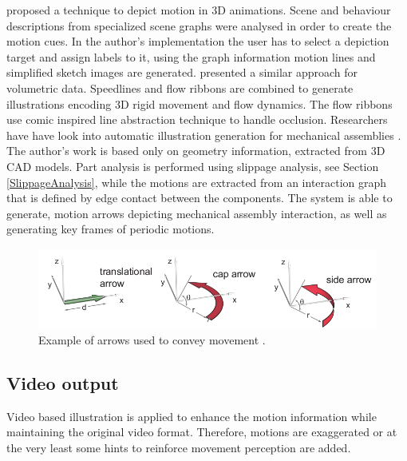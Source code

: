 \cite{Nienhaus2005} proposed a technique to depict motion in 3D animations.
Scene and behaviour descriptions from specialized scene graphs were analysed in order to create the motion cues.
In the author's implementation the user has to select a depiction target and assign labels to it, using the graph information motion lines and simplified sketch images are generated.
\cite{Joshi2005} presented a similar approach for volumetric data.
Speedlines and flow ribbons are combined to generate illustrations encoding 3D rigid movement and flow dynamics.
The flow ribbons use comic inspired line abstraction technique to handle occlusion.
Researchers have have look into automatic illustration generation for mechanical assemblies \cite{Mitra2010}.
The author's work is based only on geometry information, extracted from 3D CAD models.
Part analysis is performed using slippage analysis, see Section \ref{SlippageAnalysis}, while the motions are extracted from an interaction graph that is defined by edge contact between the components.
The system is able to generate, motion arrows depicting mechanical assembly interaction, as well as generating key frames of periodic motions.

\begin{figure}[!htbp]
	\centering
	\includegraphics[scale=.5]{images/arrow_types2}
	\caption{Example of arrows used to convey movement \cite{Mitra2010}.}
	\label{fig:arrowTypes}
\end{figure}

\subsection{Video output}

Video based illustration is applied to enhance the motion information while maintaining the original video format.
Therefore, motions are exaggerated or at the very least some hints to reinforce movement perception are added.

